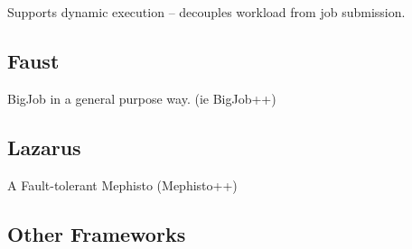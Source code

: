\documentclass[a4paper,10pt]{article}
\begin{document}
Supports dynamic execution -- decouples workload from job submission.

\subsection{Faust}

BigJob in a general purpose way. (ie BigJob++)

\subsection{Lazarus}

A Fault-tolerant Mephisto (Mephisto++)

\subsection{Other Frameworks}


  
 
\end{document}

